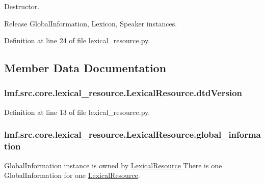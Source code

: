 Destructor. 

Release Global\+Information, Lexicon, Speaker instances. 

Definition at line 24 of file lexical\+\_\+resource.\+py.



\subsection{Member Data Documentation}
\hypertarget{classlmf_1_1src_1_1core_1_1lexical__resource_1_1_lexical_resource_a2b48b5abc2a03ba17749f2e361f948fe}{
\subsubsection[{dtd\+Version}]{\setlength{\rightskip}{0pt plus 5cm}lmf.\+src.\+core.\+lexical\+\_\+resource.\+Lexical\+Resource.\+dtd\+Version}}\label{classlmf_1_1src_1_1core_1_1lexical__resource_1_1_lexical_resource_a2b48b5abc2a03ba17749f2e361f948fe}


Definition at line 13 of file lexical\+\_\+resource.\+py.

\hypertarget{classlmf_1_1src_1_1core_1_1lexical__resource_1_1_lexical_resource_a0d5cc63c48e3c5aa2bea6ad21c288e4f}{
\subsubsection[{global\+\_\+information}]{\setlength{\rightskip}{0pt plus 5cm}lmf.\+src.\+core.\+lexical\+\_\+resource.\+Lexical\+Resource.\+global\+\_\+information}}\label{classlmf_1_1src_1_1core_1_1lexical__resource_1_1_lexical_resource_a0d5cc63c48e3c5aa2bea6ad21c288e4f}


Global\+Information instance is owned by \hyperlink{classlmf_1_1src_1_1core_1_1lexical__resource_1_1_lexical_resource}{Lexical\+Resource} There is one Global\+Information for one \hyperlink{classlmf_1_1src_1_1core_1_1lexical__resource_1_1_lexical_resource}{Lexical\+Resource}. 




